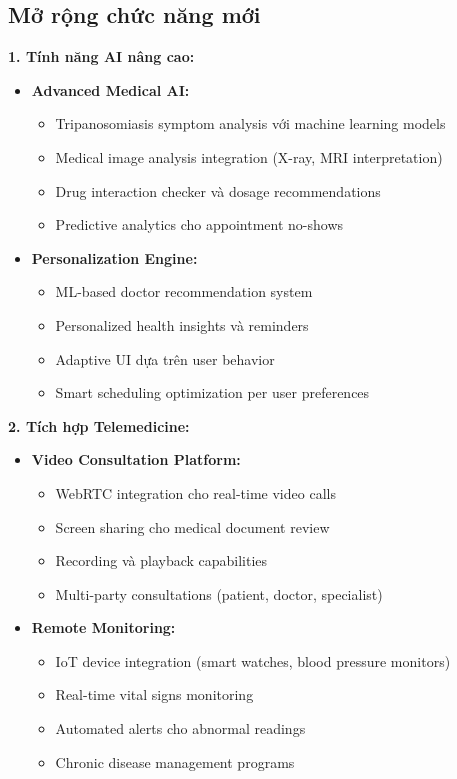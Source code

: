 \documentclass[../DoAn.tex]{subfiles}
\begin{document}
\subsection{Mở rộng chức năng mới}

\textbf{1. Tính năng AI nâng cao:}
\begin{itemize}
    \item \textbf{Advanced Medical AI:}
    \begin{itemize}
        \item Tripanosomiasis symptom analysis với machine learning models
        \item Medical image analysis integration (X-ray, MRI interpretation)
        \item Drug interaction checker và dosage recommendations
        \item Predictive analytics cho appointment no-shows
    \end{itemize}
    
    \item \textbf{Personalization Engine:}
    \begin{itemize}
        \item ML-based doctor recommendation system
        \item Personalized health insights và reminders
        \item Adaptive UI dựa trên user behavior
        \item Smart scheduling optimization per user preferences
    \end{itemize}
\end{itemize}

\textbf{2. Tích hợp Telemedicine:}
\begin{itemize}
    \item \textbf{Video Consultation Platform:}
    \begin{itemize}
        \item WebRTC integration cho real-time video calls
        \item Screen sharing cho medical document review
        \item Recording và playback capabilities
        \item Multi-party consultations (patient, doctor, specialist)
    \end{itemize}
    
    \item \textbf{Remote Monitoring:}
    \begin{itemize}
        \item IoT device integration (smart watches, blood pressure monitors)
        \item Real-time vital signs monitoring
        \item Automated alerts cho abnormal readings
        \item Chronic disease management programs
    \end{itemize}
\end{itemize}
\end{document}

